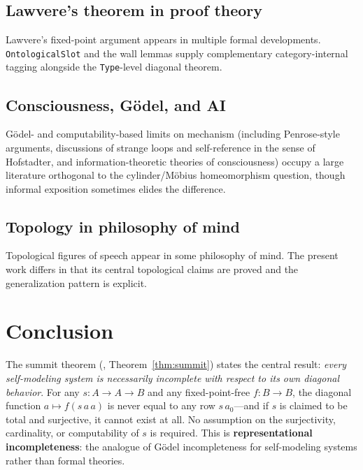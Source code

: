 \documentclass[11pt]{article}
\begin{document}
\subsection{Lawvere's theorem in proof theory}
Lawvere's fixed-point argument appears in multiple formal developments.
\texttt{OntologicalSlot} and the wall lemmas supply complementary
category-internal tagging alongside the \texttt{Type}-level diagonal theorem.

\subsection{Consciousness, G\"odel, and AI}
G\"odel- and computability-based limits on mechanism (including Penrose-style
arguments, discussions of strange loops and self-reference in the sense of
Hofstadter, and information-theoretic theories of
consciousness) occupy a large literature orthogonal to the cylinder/M\"obius
homeomorphism question, though informal exposition sometimes elides the
difference.

\subsection{Topology in philosophy of mind}
Topological figures of speech appear in some philosophy of mind. The present
work differs in that its central topological claims are proved and the
generalization pattern is explicit.

\section{Conclusion}
\label{sec:conclusion}

The summit theorem (,
Theorem~\ref{thm:summit}) states the central result:
\emph{every self-modeling system is necessarily incomplete with respect
to its own diagonal behavior}.  For any $s : A \to A \to B$ and any
fixed-point-free $f : B \to B$, the diagonal function
$a \mapsto f(s\,a\,a)$ is never equal to any row $s\,a_0$---and if $s$
is claimed to be total and surjective, it cannot exist at all.  No
assumption on the surjectivity, cardinality, or computability of $s$ is
required.  This is \textbf{representational incompleteness}: the
analogue of G\"odel incompleteness for self-modeling systems rather than
formal theories.
\end{document}

